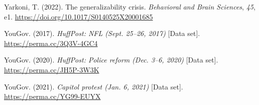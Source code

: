 \documentclass[twocolumn, 11pt, letterpaper]{article}
\newenvironment{CSLReferences}[2]{}{}
\begin{document}
\begin{CSLReferences}{1}{0}
\leavevmode{}%
Yarkoni, T. (2022). The generalizability crisis. \emph{Behavioral and
Brain Sciences}, \emph{45}, e1.
\url{https://doi.org/10.1017/S0140525X20001685}

\leavevmode{}%
YouGov. (2017). \emph{{HuffPost: NFL} {(Sept. 25--26, 2017)}} {[}Data
set{]}. \url{https://perma.cc/3Q3V-4GC4}

\leavevmode{}%
YouGov. (2020). \emph{{HuffPost}: Police reform {(Dec. 3--6, 2020)}}
{[}Data set{]}. \url{https://perma.cc/JH5P-3W3K}

\leavevmode{}%
YouGov. (2021). \emph{Capitol protest {(Jan. 6, 2021)}} {[}Data set{]}.
\url{https://perma.cc/YG99-EUYX}

\end{CSLReferences}

\endgroup

\newpage

\setcounter{table}{0}
\renewcommand{\thetable}{A\arabic{table}}
\end{document}
